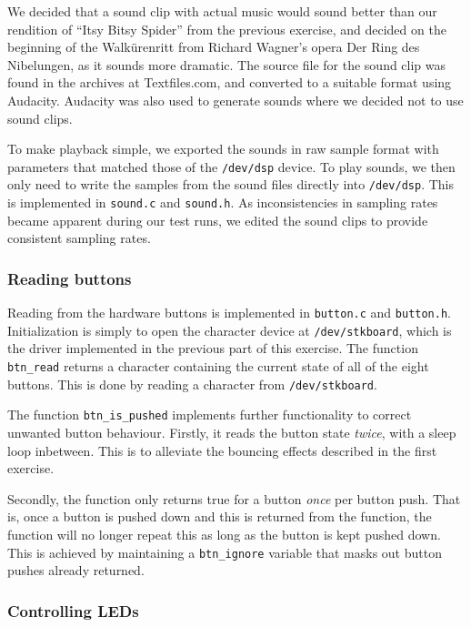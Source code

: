 We decided that a sound clip with actual music would sound better than
our rendition of ``Itsy Bitsy Spider'' from the previous exercise, and
decided on the beginning of the Walkürenritt from Richard Wagner's
opera Der Ring des Nibelungen, as it sounds more dramatic. The source
file for the sound clip was found in the archives at Textfiles.com, and
converted to a suitable format using Audacity. Audacity was also used to
generate sounds where we decided not to use sound clips.

To make playback simple, we exported the sounds in raw sample format
with parameters that matched those of the \texttt{/dev/dsp} device. To
play sounds, we then only need to write the samples from the sound files
directly into \texttt{/dev/dsp}. This is implemented in \texttt{sound.c}
and \texttt{sound.h}. As inconsistencies in sampling rates became
apparent during our test runs, we edited the sound clips to provide
consistent sampling rates.

\subsubsection{Reading buttons}

Reading from the hardware buttons is implemented in \texttt{button.c}
and \texttt{button.h}. Initialization is simply to open the character
device at \texttt{/dev/stkboard}, which is the driver implemented in the
previous part of this exercise. The function \texttt{btn\_read} returns
a character containing the current state of all of the eight buttons.
This is done by reading a character from \texttt{/dev/stkboard}.

The function \texttt{btn\_is\_pushed} implements further functionality to
correct unwanted button behaviour. Firstly, it reads the button state
\emph{twice}, with a sleep loop inbetween. This is to alleviate the
bouncing effects described in the first exercise.

Secondly, the function only returns true for a button \emph{once} per
button push. That is, once a button is pushed down and this is returned
from the function, the function will no longer repeat this as long as
the button is kept pushed down. This is achieved by maintaining a
\texttt{btn\_ignore} variable that masks out button pushes already
returned.

\subsubsection{Controlling LEDs}

